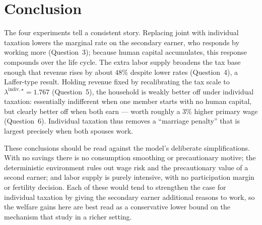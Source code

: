 \section{Conclusion}

The four experiments tell a consistent story. Replacing joint with individual taxation lowers the marginal rate on the secondary earner, who responds by working more (Question~3); because human capital accumulates, this response compounds over the life cycle. The extra labor supply broadens the tax base enough that revenue rises by about $48\%$ despite lower rates (Question~4), a Laffer-type result. Holding revenue fixed by recalibrating the tax scale to $\lambda^{\text{indiv},\star} = 1.767$ (Question~5), the household is weakly better off under individual taxation: essentially indifferent when one member starts with no human capital, but clearly better off when both earn --- worth roughly a $3\%$ higher primary wage (Question~6). Individual taxation thus removes a ``marriage penalty'' that is largest precisely when both spouses work.

These conclusions should be read against the model's deliberate simplifications. With no savings there is no consumption smoothing or precautionary motive; the deterministic environment rules out wage risk and the precautionary value of a second earner; and labor supply is purely intensive, with no participation margin or fertility decision. Each of these would tend to strengthen the case for individual taxation by giving the secondary earner additional reasons to work, so the welfare gains here are best read as a conservative lower bound on the mechanism that \cite{borella2023} study in a richer setting.
